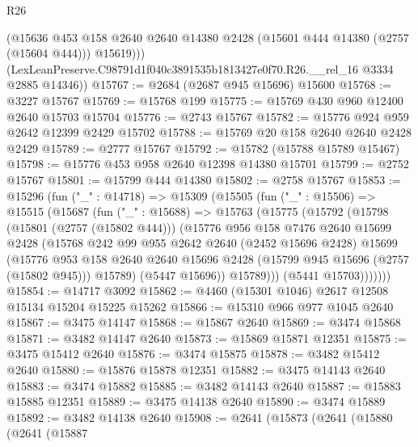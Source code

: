 \begin{lexlean}{R26}
\begin{coremodule}
          (@15636
            @453
            @158
            @2640
            @2640
            @14380
            @2428
            (@15601 @444 @14380 (@2757 (@15604 @444)))
            @15619)))
      (LexLeanPreserve.C98791d1f040c3891535b1813427e0f70.R26.__rel_16 @3334 @2885 @14346))
@15767 := @2684 (@2687 @945 @15696) @15600
@15768 := @3227 @15767
@15769 := @15768 @199
@15775 := @15769 @430 @960 @12400 @2640 @15703 @15704
@15776 := @2743 @15767
@15782 := @15776 @924 @959 @2642 @12399 @2429 @15702
@15788 := @15769 @20 @158 @2640 @2640 @2428 @2429
@15789 := @2777 @15767
@15792 := @15782 (@15788 @15789 @15467)
@15798 := @15776 @453 @958 @2640 @12398 @14380 @15701
@15799 := @2752 @15767
@15801 := @15799 @444 @14380
@15802 := @2758 @15767
@15853 := @15296
    (fun ("_" : @14718) =>
    @15309
      (@15505
        (fun ("_" : @15506) =>
        @15515
          (@15687
            (fun ("_" : @15688) =>
            @15763
              (@15775
                (@15792
                  (@15798
                    (@15801 (@2757 (@15802 @444)))
                    (@15776
                      @956
                      @158
                      @7476
                      @2640
                      @15699
                      @2428
                      (@15768
                        @242
                        @99
                        @955
                        @2642
                        @2640
                        (@2452 @15696 @2428)
                        @15699
                        (@15776
                          @953
                          @158
                          @2640
                          @2640
                          @15696
                          @2428
                          (@15799 @945 @15696 (@2757 (@15802 @945)))
                          @15789)
                        (@5447 @15696))
                      @15789)))
                (@5441 @15703)))))))
@15854 := @14717 @3092
@15862 := @4460 (@15301 @1046) @2617 @12508 @15134 @15204 @15225 @15262
@15866 := @15310 @966 @977 @1045 @2640
@15867 := @3475 @14147
@15868 := @15867 @2640
@15869 := @3474 @15868
@15871 := @3482 @14147 @2640
@15873 := @15869 @15871 @12351
@15875 := @3475 @15412 @2640
@15876 := @3474 @15875
@15878 := @3482 @15412 @2640
@15880 := @15876 @15878 @12351
@15882 := @3475 @14143 @2640
@15883 := @3474 @15882
@15885 := @3482 @14143 @2640
@15887 := @15883 @15885 @12351
@15889 := @3475 @14138 @2640
@15890 := @3474 @15889
@15892 := @3482 @14138 @2640
@15908 := @2641
    (@15873
      (@2641
        (@15880
          (@2641
            (@15887

\end{coremodule}
\end{lexlean}

